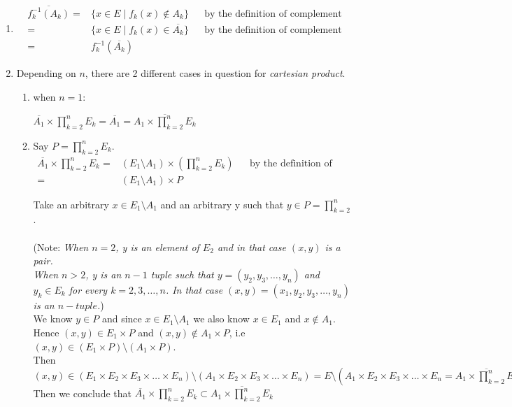 \documentclass[12pt]{article}
\begin{document}
\begin{enumerate}[label=(\alph*)]
\item 

\begin{align*}
	\overline{f_{k}^{-1}(A_k)} = & \{x\in E \mid f_k(x)\notin A_k\} && \text{by the definition of complement}\\
							   = & \{x\in E \mid f_k(x)\in \overline{A_k}\} &&\text{by the definition of complement}\\
							   = & f_{k}^{-1}(\overline{A_k})
\end{align*}

\item Depending on $n$, there are 2 different cases in question for \textit{cartesian product}.

\begin{enumerate}[label=(\roman*)]

\item when $n=1$:

$\overline{A_1}\times \prod_{k=2}^{n} E_k = \overline{A_1} = \overline{A_1\times \prod_{k=2}^{n} E_k}$

\item Say $P=\prod_{k=2}^{n} E_k$.\\
\begin{align*}
	\overline{A_1}\times \prod_{k=2}^{n} E_k = & (E_1\setminus A_1)\times (\prod_{k=2}^{n} E_k) &&\text{by the definition of complement}\\
			 							     = & (E_1\setminus A_1)\times P
\end{align*}

Take an arbitrary $x\in E_1\setminus A_1$ and an arbitrary y such that $y\in P=\prod_{k=2}^{n}$.\\ \\
(Note: \textit{When $n=2$, y is an element of $E_2$ and in that case $(x,y)$ is a pair.\\When $n>2$, y is an $n-1$ tuple such that $y=(y_2, y_3,\dots, y_n)$ and $y_k\in E_k$ for every $k=2,3,\dots,n$. In that case $(x,y)=(x_1, y_2, y_3,\dots, y_n)$ is an $n-tuple$.})\\

We know $y\in P$ and since $x\in E_1\setminus A_1$ we also know $x\in E_1$ and $x\notin A_1$. Hence $(x,y)\in E_1\times P$ and $(x,y)\notin A_1\times P$,  i.e $(x,y)\in (E_1\times P)\setminus (A_1\times P)$.\\
Then $(x,y)\in (E_1\times E_2\times E_3\times\dots \times E_n)\setminus (A_1\times E_2\times E_3\times\dots \times E_n) = E\setminus (A_1\times E_2\times E_3\times\dots \times E_n = \overline{A_1\times \prod_{k=2}^{n} E_k})$\\
Then we conclude that $\overline{A_1}\times \prod_{k=2}^{n} E_k \subset \overline{A_1\times \prod_{k=2}^{n} E_k}$


\end{enumerate}
\end{enumerate}
\end{document}
